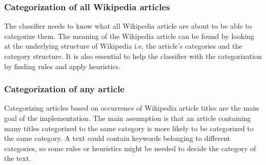 \subsubsection{Categorization of all Wikipedia articles}
The classifier needs to know what all Wikipedia article are about to be able to categorize them. The meaning of the Wikipedia article can be found by looking at the underlying structure of Wikipedia i.e, the article's categories and the category structure. It is also essential to help the classifier with the categorization by finding rules and apply heuristics. 

\begin{comment}

Categorizing the articles can be done 

When the most describing categories of the article is found

Here the task is to create classifier that looks at the underlying structure of Wikipedia to describe the categories and then 

into their most describing categories. To be able to do this, it is essential to look at the underlying structure of Wikipedia to determine what the article is about. 

Since there are no training sets available, the categorization has to be unsupervised. Wikipedia still has an underlying structure which is useful for determining the most likely categories for all Wikipedia articles. This means that we can use this as heuristic for our categorization. 
\end{comment}


\subsubsection{Categorization of any article}
Categorizing articles based on occurrence of Wikipedia article titles are the main goal of the implementation. The main assumption is that an article containing many titles categorized to the same category is more likely to be categorized to the same category. A text could contain keywords belonging to different categories, so some rules or heuristics might be needed to decide the category of the text. 

\begin{comment}
Mye nyttig: 

To be able to categorize any article given as input, it is essential to have a list of keywords which give some indication of possible categories for the article. A keyword list should contain words or phrases useful for classification, and we have chosen the Wikipedia titles to be such a list. 

\end{comment}

